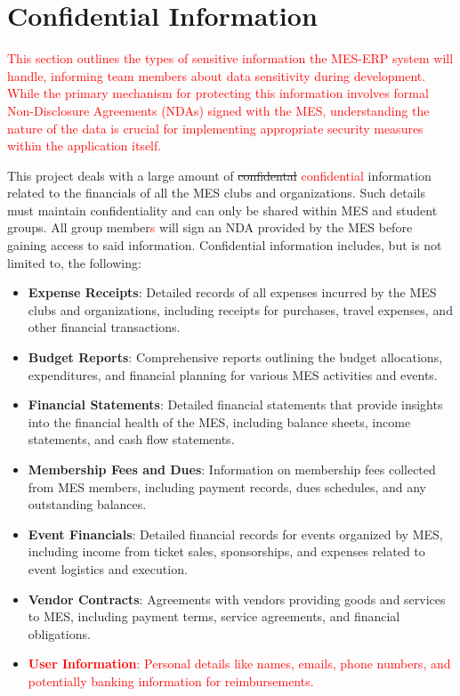 \documentclass{article}
\begin{document}
\section{Confidential Information}
\textcolor{red}{This section outlines the types of sensitive information the MES-ERP system will handle, informing team members about data sensitivity during development. While the primary mechanism for protecting this information involves formal Non-Disclosure Agreements (NDAs) signed with the MES, understanding the nature of the data is crucial for implementing appropriate security measures within the application itself.}

This project deals with a large amount of \sout{confidental} \textcolor{red}{confidential} information related to the financials of all the MES clubs and organizations. Such details must maintain confidentiality and can only be shared within MES and student groups. All group member\textcolor{red}{s} will sign an NDA provided by the MES before gaining access to said information. Confidential information includes, but is not limited to, the following:

\begin{itemize}
  \item \textbf{Expense Receipts}: Detailed records of all expenses incurred by the MES clubs and organizations, including receipts for purchases, travel expenses, and other financial transactions.
  \item \textbf{Budget Reports}: Comprehensive reports outlining the budget allocations, expenditures, and financial planning for various MES activities and events.
  \item \textbf{Financial Statements}: Detailed financial statements that provide insights into the financial health of the MES, including balance sheets, income statements, and cash flow statements.
  \item \textbf{Membership Fees and Dues}: Information on membership fees collected from MES members, including payment records, dues schedules, and any outstanding balances.
  \item \textbf{Event Financials}: Detailed financial records for events organized by MES, including income from ticket sales, sponsorships, and expenses related to event logistics and execution.
  \item \textbf{Vendor Contracts}: Agreements with vendors providing goods and services to MES, including payment terms, service agreements, and financial obligations.
  \item \textcolor{red}{\textbf{User Information}: Personal details like names, emails, phone numbers, and potentially banking information for reimbursements.}
\end{itemize}
\end{document}
